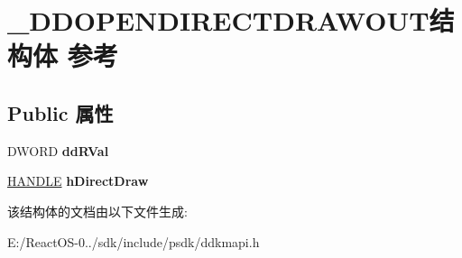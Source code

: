 \hypertarget{struct___d_d_o_p_e_n_d_i_r_e_c_t_d_r_a_w_o_u_t}{}\section{\+\_\+\+D\+D\+O\+P\+E\+N\+D\+I\+R\+E\+C\+T\+D\+R\+A\+W\+O\+U\+T结构体 参考}
\label{struct___d_d_o_p_e_n_d_i_r_e_c_t_d_r_a_w_o_u_t}
\subsection*{Public 属性}
\begin{DoxyCompactItemize}
\item 
\mbox{\label{struct___d_d_o_p_e_n_d_i_r_e_c_t_d_r_a_w_o_u_t_af1fe6893ed4539f276db4ff2d9b52400}} 
D\+W\+O\+RD {\bfseries dd\+R\+Val}
\item 
\mbox{\label{struct___d_d_o_p_e_n_d_i_r_e_c_t_d_r_a_w_o_u_t_a87dc5fa781502a5be4e712edf75c2f8a}} 
\hyperlink{interfacevoid}{H\+A\+N\+D\+LE} {\bfseries h\+Direct\+Draw}
\end{DoxyCompactItemize}


该结构体的文档由以下文件生成\+:\begin{DoxyCompactItemize}
\item 
E\+:/\+React\+O\+S-\/0../sdk/include/psdk/ddkmapi.\+h\end{DoxyCompactItemize}
